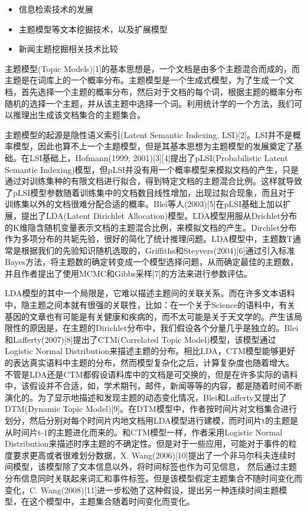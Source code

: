 \begin{itemize}
\item 信息检索技术的发展
\item 主题模型等文本挖掘技术，以及扩展模型
\item 新闻主题挖掘相关技术比较
\end{itemize}

主题模型(Topic Models)[1]的基本思想是，一个文档是由多个主题混合而成的，而主题是在词库上的一个概率分布。主题模型是一个生成式模型，为了生成一个文档，首先选择一个主题的概率分布，然后对于文档的每个词，根据主题的概率分布随机的选择一个主题，并从该主题中选择一个词。利用统计学的一个方法，我们可以推理出生成该文档集合的主题集合。


主题模型的起源是隐性语义索引(Latent Semantic Indexing, LSI)[2]。LSI并不是概率模型，因此也算不上一个主题模型，但是其基本思想为主题模型的发展奠定了基础。在LSI基础上，Hofmann(1999; 2001)[3][4]提出了pLSI(Probabilistic Latent Semantic Indexing)模型，但pLSI并没有用一个概率模型来模拟文档的产生，只是通过对训练集种的有限文档进行拟合，得到特定文档的主题混合比例。这样就导致了pLSI模型参数随着训练集中的文档数目线性增加，出现过拟合现象，而且对于训练集以外的文档很难分配合适的概率。Blei等人(2003)[5]在pLSI基础上加以扩展，提出了LDA(Latent Dirichlet Allocation)模型。LDA模型用服从Drichlet分布的K维隐含随机变量表示文档的主题混合比例，来模拟文档的产生。Dirchlet分布作为多项分布的共轭先验，很好的简化了统计推理问题。LDA模型中，主题数T通常是根据我们的先验知识随机选取的，Griffiths和Steyvers(2004)[6]通过引入标准Bayes方法，将主题数的确定转变成一个模型选择问题，从而确定最佳的主题数，并且作者提出了使用MCMC和Gibbs采样[7]的方法来进行参数评估。


LDA模型的其中一个局限是，它难以描述主题间的关联关系。而在许多文本语料中，隐主题之间本就有很强的关联性，比如：在一个关于Science的语料中，有关基因的文章也有可能是有关健康和疾病的，而不太可能是关于天文学的。产生该局限性的原因是，在主题的Dirichlet分布中，我们假设各个分量几乎是独立的。Blei和Lafferty(2007)[8]提出了CTM(Correlated Topic Model)模型，该模型通过Logistic Normal Distribution来描述主题的分布。相比LDA，CTM模型能够更好的表达真实语料中主题的分布，然而模型复杂化之后，计算复杂度也随着增大。
不管是LDA还是CTM都假设语料库中的文档是可交换的，但是在许多实际的语料中，该假设并不合适，如，学术期刊，邮件，新闻等等的内容，都是随着时间不断演化的。为了显示地描述和发现主题的动态变化情况，Blei和Lafferty又提出了DTM(Dynamic Topic Model)[9]。在DTM模型中，作者按时间片对文档集合进行划分，然后分别对每个时间片内地文档用LDA模型进行建模，而时间片t的主题是从时间片t-1的主题进化而来的。和CTM模型一样，作者采用Logistic Normal Distribution来描述时序主题的不确定性。但是对于一些应用，可能对于事件的粒度要求更高或者很难划分数据，X. Wang(2006)[10]提出了一个非马尔科夫连续时间模型，该模型除了文本信息以外，将时间标签也作为可见信息，
然后通过主题分布信息同时关联起来词汇和事件标签。但是该模型假定主题集合不随时间变化而变化，C. Wang(2008)[11]进一步松弛了这种假设，提出另一种连续时间主题模型，在这个模型中，主题集合随着时间变化而变化。


